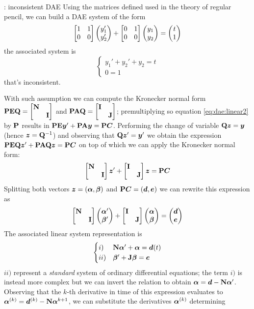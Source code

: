 		\begin{example}{: inconsistent DAE}
			Using the matrices defined used in the theory of regular pencil, we can build a DAE system of the form
			\[ \begin{bmatrix} 1 & 1 \\ 0 & 0 \end{bmatrix} \begin{pmatrix} y_1' \\ y_2' \end{pmatrix} + \begin{bmatrix} 0 & 1 \\ 0 & 0  \end{bmatrix} \begin{pmatrix} y_1 \\ y_2 \end{pmatrix} = \begin{pmatrix} t \\ 1 \end{pmatrix} \]
			the associated system is
			\[ \begin{cases}
				y_1' + y_2' + y_2 = t \\ 0 = 1
			\end{cases} \]
			that's inconsistent.
		\end{example}
		 With such assumption we can compute the Kronecker normal form $\mathbf{PEQ} = \begin{bmatrix} \mathbf{N} \\ & \mathbf{I} \end{bmatrix}$ and $\mathbf{PAQ} = \begin{bmatrix} \mathbf{I} \\ & \mathbf{J} \end{bmatrix}$; premultiplying so equation \ref{eq:dae:linear2} by $\mathbf{P}$ results in $\mathbf{PE}\boldsymbol{y}' + \mathbf{PA}\boldsymbol{y} = \mathbf{P} \boldsymbol{C}$.
	\newcommand{\y}{\vett y} \newcommand{\z}{\vett z} \newcommand{\inv}{^{-1}}
		Performing the change of variable $\mat Q \z = \y$ (hence $\z = \mat Q\inv$) and observing that $\mat Q \z' = \y'$ we obtain the expression $\mat{PEQ} \z' + \mat{PAQ}\z = \mat P\vett C$ on top of which we can apply the Kronecker normal form:
		\[ \matrix{\mat N \\ & \mat I} \z' + \matrix{\mat I \\ & \mat J} \z = \mat P \vett C  \]
		Splitting both vectors $\boldsymbol{z} = (\boldsymbol{\alpha},\boldsymbol{\beta})$ and $\mathbf{P}\boldsymbol{C} = (\boldsymbol{d},\boldsymbol{e})$ we can rewrite this expression as
		\[ \begin{bmatrix} \mathbf{N} \\ & \mathbf{I} \end{bmatrix} \begin{pmatrix} \boldsymbol{\alpha}' \\ \boldsymbol{\beta}' \end{pmatrix} + \begin{bmatrix} \mathbf{I} \\ & \mathbf{J} \end{bmatrix} \begin{pmatrix} \boldsymbol{\alpha} \\ \boldsymbol{\beta} \end{pmatrix} =\begin{pmatrix} \boldsymbol{d} \\ \boldsymbol{e} \end{pmatrix}  \]
		The associated linear system representation is
		\[ \begin{cases}
			i)&\mathbf{N} \boldsymbol{\alpha} ' + \boldsymbol{\alpha} = \boldsymbol{d}(t) \\
			ii)& \boldsymbol{\beta}' + \mathbf{J} \boldsymbol{\beta} = \boldsymbol{e}
		\end{cases} \]
		$ii)$ represent a \textit{standard} system of ordinary differential equations; the term $i)$ is instead more complex but we can invert the relation to obtain $\boldsymbol{\alpha} = \boldsymbol{d} - \mathbf{N} \boldsymbol{\alpha}'$. Observing that the $k$-th derivative in time of this expression evaluates to $\boldsymbol{\alpha}^{(k)} = \boldsymbol{d}^{(k)} - \mathbf{N} \boldsymbol{\alpha}^{k+1}$, we can substitute the derivatives $\boldsymbol{\alpha}^{(k)}$ determining
